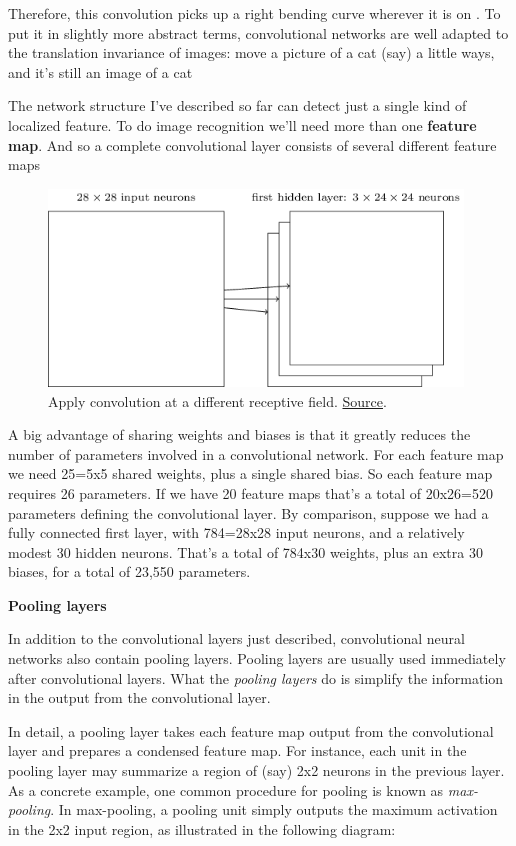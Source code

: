 \documentclass[a4paper]{tufte-handout}
\begin{document}
Therefore, this convolution picks up a right bending curve wherever it
is on . To put it in slightly more abstract terms, convolutional
networks are well adapted to the translation invariance of images: move
a picture of a cat (say) a little ways, and it's still an image of a cat

The network structure I've described so far can detect just a single
kind of localized feature. To do image recognition we'll need more than
one \textbf{feature map}. And so a complete convolutional layer consists
of several different feature maps

\begin{figure}
\includegraphics[width=110mm]{conv4.png}
\caption{Apply convolution at a different receptive field.
\href{http://neuralnetworksanddeeplearning.com/chap6.html}{Source}.
}
\end{figure}

A big advantage of sharing weights and biases is that it greatly reduces
the number of parameters involved in a convolutional network. For each
feature map we need 25=5x5 shared weights, plus a single shared bias. So
each feature map requires 26 parameters. If we have 20 feature maps
that's a total of 20x26=520 parameters defining the convolutional layer.
By comparison, suppose we had a fully connected first layer, with
784=28x28 input neurons, and a relatively modest 30 hidden neurons.
That's a total of 784x30 weights, plus an extra 30 biases, for a total
of 23,550 parameters.


\noindent \textbf{Pooling layers}

In addition to the convolutional layers just described, convolutional
neural networks also contain pooling layers. Pooling layers are usually
used immediately after convolutional layers. What the \emph{pooling
layers} do is simplify the information in the output from the
convolutional layer.

In detail, a pooling layer takes each feature map output from the
convolutional layer and prepares a condensed feature map. For instance,
each unit in the pooling layer may summarize a region of (say) 2x2
neurons in the previous layer. As a concrete example, one common
procedure for pooling is known as \emph{max-pooling}. In max-pooling, a
pooling unit simply outputs the maximum activation in the 2x2 input
region, as illustrated in the following diagram:
\end{document}
